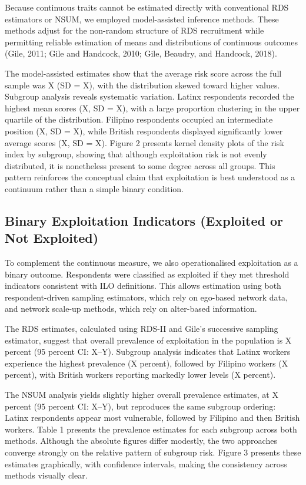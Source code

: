 \documentclass[
  12pt,
  letterpaper,
  DIV=11,
  numbers=noendperiod]{scrartcl}
\theoremstyle{plain}
\theoremstyle{definition}
\begin{document}
Because continuous traits cannot be estimated directly with conventional
RDS estimators or NSUM, we employed model-assisted inference methods.
These methods adjust for the non-random structure of RDS recruitment
while permitting reliable estimation of means and distributions of
continuous outcomes (Gile, 2011; Gile and Handcock, 2010; Gile, Beaudry,
and Handcock, 2018).

The model-assisted estimates show that the average risk score across the
full sample was X (SD = X), with the distribution skewed toward higher
values. Subgroup analysis reveals systematic variation. Latinx
respondents recorded the highest mean scores (X, SD = X), with a large
proportion clustering in the upper quartile of the distribution.
Filipino respondents occupied an intermediate position (X, SD = X),
while British respondents displayed significantly lower average scores
(X, SD = X). Figure 2 presents kernel density plots of the risk index by
subgroup, showing that although exploitation risk is not evenly
distributed, it is nonetheless present to some degree across all groups.
This pattern reinforces the conceptual claim that exploitation is best
understood as a continuum rather than a simple binary condition.

\subsection{Binary Exploitation Indicators (Exploited or Not
Exploited)}\label{binary-exploitation-indicators-exploited-or-not-exploited}

To complement the continuous measure, we also operationalised
exploitation as a binary outcome. Respondents were classified as
exploited if they met threshold indicators consistent with ILO
definitions. This allows estimation using both respondent-driven
sampling estimators, which rely on ego-based network data, and network
scale-up methods, which rely on alter-based information.

The RDS estimates, calculated using RDS-II and Gile's successive
sampling estimator, suggest that overall prevalence of exploitation in
the population is X percent (95 percent CI: X--Y). Subgroup analysis
indicates that Latinx workers experience the highest prevalence (X
percent), followed by Filipino workers (X percent), with British workers
reporting markedly lower levels (X percent).

The NSUM analysis yields slightly higher overall prevalence estimates,
at X percent (95 percent CI: X--Y), but reproduces the same subgroup
ordering: Latinx respondents appear most vulnerable, followed by
Filipino and then British workers. Table 1 presents the prevalence
estimates for each subgroup across both methods. Although the absolute
figures differ modestly, the two approaches converge strongly on the
relative pattern of subgroup risk. Figure 3 presents these estimates
graphically, with confidence intervals, making the consistency across
methods visually clear.
\end{document}

